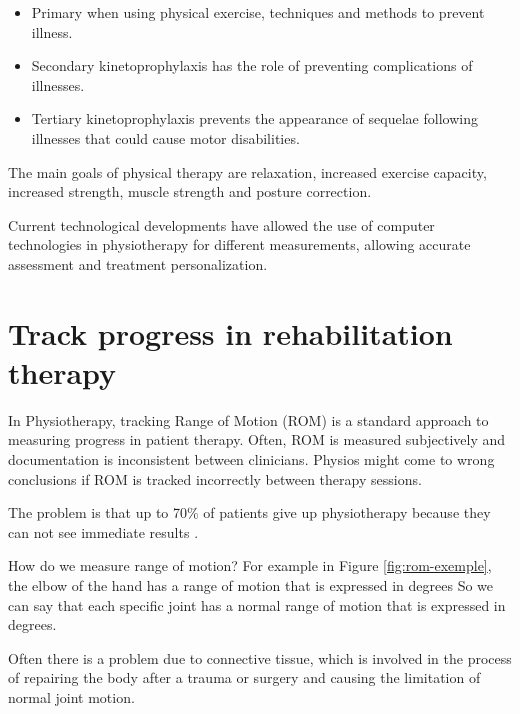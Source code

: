 \begin{itemize}
  \item Primary when using physical exercise, techniques and methods to prevent illness.
  \item Secondary kinetoprophylaxis has the role of preventing complications of illnesses.
  \item Tertiary kinetoprophylaxis prevents the appearance of sequelae following illnesses that could cause motor disabilities.
\end{itemize}


The main goals of physical therapy are relaxation, increased exercise capacity, 
increased strength, muscle strength and posture correction.

Current technological developments have allowed the use of computer technologies in physiotherapy
 for different measurements, allowing accurate assessment and treatment personalization.
\section{Track progress in rehabilitation therapy}


\par In Physiotherapy, tracking Range of Motion (ROM) is a standard approach to measuring progress in patient therapy. 
Often, ROM is measured subjectively and documentation is inconsistent between clinicians. 
Physios might come to wrong conclusions if ROM is tracked incorrectly between therapy sessions.


\par The problem is that up to 70\% of patients give up physiotherapy because they can not see 
immediate results \cite{7FactsInPhysicalTherapy}.

How do we measure range of motion? For example in Figure \ref{fig:rom-exemple}, 
the elbow of the hand has a range of motion that is expressed in degrees
So we can say that each specific joint has a normal range of motion 
that is expressed in degrees.

Often there is a problem due to connective tissue, which is involved in 
the process of repairing the body
after a trauma or surgery and causing the limitation of normal joint motion.

